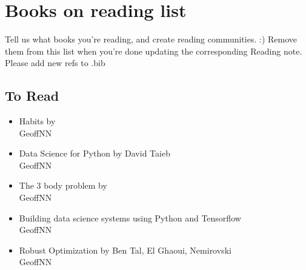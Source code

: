 
\section{Books on reading list}
Tell us what books you're reading, and create reading communities. :) Remove them from this list when you're done updating the corresponding Reading note. Please add new refs to .bib

\subsection{To Read}
\begin{itemize}
    \item Habits by \\
    GeoffNN
    \item Data Science for Python by David Taieb \\
    GeoffNN
    \item The 3 body problem by \\
    GeoffNN
    \item Building data science systems using Python and Tensorflow \\
    GeoffNN
    \item Robust Optimization by Ben Tal, El Ghaoui, Nemirovski \\
    GeoffNN
\end{itemize}
